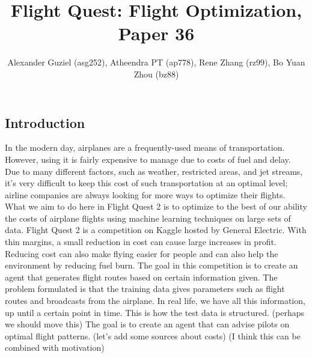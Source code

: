 \documentclass{article}[12pt]
\renewenvironment{abstract}
  {\center
  {\bfseries{\large\abstractname}}}
  {\center}
\begin{document}
\title{Flight Quest: Flight Optimization, Paper 36}
\author{
	Alexander Guziel (asg252), Atheendra PT (ap778), Rene Zhang (rz99), Bo Yuan Zhou (bz88)
}
\date{}
\maketitle

\begin{abstract}
\end{abstract}
\setlength{\columnsep}{1cm}
\begin{multicols}{2}

\section{Introduction}
In the modern day, airplanes are a frequently-used means of transportation. However, using it is fairly expensive to manage due to costs of fuel and delay. Due to many different factors, such as weather, restricted areas, and jet streams, it's very difficult to keep this cost of such transportation at an optimal level; airline companies are always looking for more ways to optimize their flights. What we aim to do here in Flight Quest 2 is to optimize to the best of our ability the costs of airplane flights using machine learning techniques on large sets of data. Flight Quest 2 is a competition on Kaggle hosted by General Electric. With thin margins, a small reduction in cost can cause large increases in profit. Reducing cost can also make flying easier for people and can also help the environment by reducing fuel burn. The goal in this competition is to create an agent that generates flight routes based on certain information given. The problem formulated is that the training data gives parameters such as flight routes and broadcasts from the airplane. In real life, we have all this information, up until a certain point in time. This is how the test data is structured. (perhaps we should move this) The goal is to create an agent that can advise pilots on optimal flight patterns. (let's add some sources about costs) (I think this can be combined with motivation)


\end{multicols}
\end{document}
